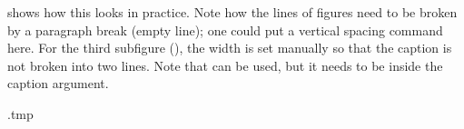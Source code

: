  shows how this looks in practice.
Note how the lines of figures need to be broken by a paragraph break (empty line);
one could put a vertical spacing command here.
For the third subfigure (),
the width is set manually so that the caption is not broken into two lines.
Note that  can be used, but it needs to be inside the caption argument.
%
\begin{VerbatimOut}{\jobname.tmp}
\begin{figure}
\centering



\end{figure}
\end{VerbatimOut}
